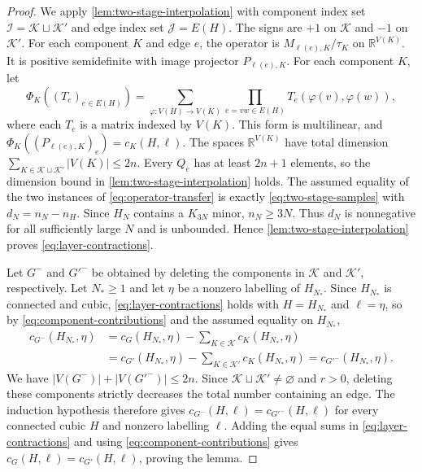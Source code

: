 \documentclass[10pt,a4paper]{article}
\theoremstyle{plain}
\theoremstyle{definition}
\newcommand{\R}{\mathbb{R}}
\begin{document}
\begin{proof}
We apply \cref{lem:two-stage-interpolation} with component index set
$\mathcal I=\mathcal K\sqcup\mathcal K'$ and edge index set $\mathcal J=E(H)$.
The signs are $+1$ on $\mathcal K$ and $-1$ on $\mathcal K'$.
For each component $K$ and edge $e$, the operator is
$M_{\ell(e),K}/\tau_K$ on $\R^{V(K)}$.
It is positive semidefinite with image projector $P_{\ell(e),K}$.
For each component $K$, let
\begin{equation}\label{eq:component-multilinear-form}
 \Phi_K((T_e)_{e\in E(H)})
 =\sum_{\varphi:V(H)\to V(K)}
   \prod_{e=vw\in E(H)}T_e(\varphi(v),\varphi(w)),
\end{equation}
where each $T_e$ is a matrix indexed by $V(K)$.
This form is multilinear, and $\Phi_K((P_{\ell(e),K})_e)=c_K(H,\ell)$.
The spaces $\R^{V(K)}$ have total dimension
$\sum_{K\in\mathcal K\sqcup\mathcal K'}|V(K)|\leq2n$.
Every $Q_e$ has at least $2n+1$ elements, so the dimension bound
in \cref{lem:two-stage-interpolation} holds.
The assumed equality of the two instances of \cref{eq:operator-transfer}
is exactly \cref{eq:two-stage-samples} with $d_N=n_N-n_H$.
Since $H_N$ contains a $K_{3N}$ minor, $n_N\geq3N$.
Thus $d_N$ is nonnegative for all sufficiently large $N$ and is unbounded.
Hence \cref{lem:two-stage-interpolation} proves \cref{eq:layer-contractions}.

Let $G^-$ and $G'^-$ be obtained by deleting the components in
$\mathcal K$ and $\mathcal K'$, respectively.
Let $N_\ast\geq1$ and let $\eta$ be a nonzero labelling of $H_{N_\ast}$.
Since $H_{N_\ast}$ is connected and cubic, \cref{eq:layer-contractions} holds
with $H=H_{N_\ast}$ and $\ell=\eta$, so by \cref{eq:component-contributions}
and the assumed equality on $H_{N_\ast}$,
\begin{equation}\label{eq:residual-contractions}
 \begin{aligned}
 c_{G^-}(H_{N_\ast},\eta)
 &=c_G(H_{N_\ast},\eta)-\sum_{K\in\mathcal K}c_K(H_{N_\ast},\eta)\\
 &=c_{G'}(H_{N_\ast},\eta)-\sum_{K\in\mathcal K'}c_K(H_{N_\ast},\eta)
 =c_{G'^-}(H_{N_\ast},\eta).
 \end{aligned}
\end{equation}
We have $|V(G^-)|+|V(G'^-)|\leq2n$.
Since $\mathcal K\sqcup\mathcal K'\ne\varnothing$ and $r>0$, deleting
these components strictly decreases the total number containing an edge.
The induction hypothesis therefore gives
$c_{G^-}(H,\ell)=c_{G'^-}(H,\ell)$ for every connected cubic $H$ and
nonzero labelling $\ell$.
Adding the equal sums in \cref{eq:layer-contractions} and using
\cref{eq:component-contributions} gives $c_G(H,\ell)=c_{G'}(H,\ell)$,
proving the lemma.
\end{proof}
\end{document}

